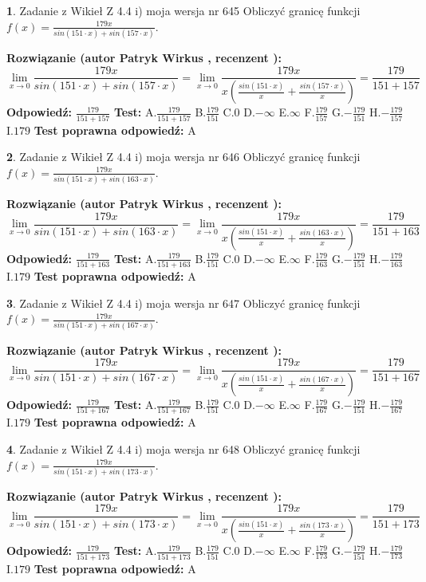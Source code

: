 \documentclass[12pt, a4paper]{article}
\theoremstyle{definition} %
\newtheorem{zad}{}
\newcommand{\zadStart}[1]{\begin{zad}#1\newline}
\newcommand{\zadStop}{\end{zad}}
\newcommand{\rozwStart}[2]{\noindent \textbf{Rozwiązanie (autor #1 , recenzent #2): }\newline}
\newcommand{\rozwStop}{\newline}
\newcommand{\odpStart}{\noindent \textbf{Odpowiedź:}\newline}
\newcommand{\odpStop}{\newline}
\newcommand{\testStart}{\noindent \textbf{Test:}\newline}
\newcommand{\testStop}{\newline}
\newcommand{\kluczStart}{\noindent \textbf{Test poprawna odpowiedź:}\newline}
\newcommand{\kluczStop}{\newline}
\begin{document}
\zadStart{Zadanie z Wikieł Z 4.4 i) moja wersja nr 645}
Obliczyć granicę funkcji $f(x)=\frac{179x}{sin(151\cdot x) +sin(157\cdot x)}$.
\zadStop
\rozwStart{Patryk Wirkus}{}
$$\lim\limits_{x\to 0}\frac{179x}{sin(151\cdot x) +sin(157\cdot x)}=\lim\limits_{x\to 0}\frac{179x}{x(\frac{sin(151\cdot x)}{x}+\frac{sin(157\cdot x)}{x})}=\frac{179}{151+157}$$
\rozwStop
\odpStart
$\frac{179}{151+157}$
\odpStop
\testStart
A.$\frac{179}{151+157}$
B.$\frac{179}{151}$
C.$0$
D.$-\infty$
E.$\infty$
F.$\frac{179}{157}$
G.$-\frac{179}{151}$
H.$-\frac{179}{157}$
I.$179$
\testStop
\kluczStart
A
\kluczStop



\zadStart{Zadanie z Wikieł Z 4.4 i) moja wersja nr 646}
Obliczyć granicę funkcji $f(x)=\frac{179x}{sin(151\cdot x) +sin(163\cdot x)}$.
\zadStop
\rozwStart{Patryk Wirkus}{}
$$\lim\limits_{x\to 0}\frac{179x}{sin(151\cdot x) +sin(163\cdot x)}=\lim\limits_{x\to 0}\frac{179x}{x(\frac{sin(151\cdot x)}{x}+\frac{sin(163\cdot x)}{x})}=\frac{179}{151+163}$$
\rozwStop
\odpStart
$\frac{179}{151+163}$
\odpStop
\testStart
A.$\frac{179}{151+163}$
B.$\frac{179}{151}$
C.$0$
D.$-\infty$
E.$\infty$
F.$\frac{179}{163}$
G.$-\frac{179}{151}$
H.$-\frac{179}{163}$
I.$179$
\testStop
\kluczStart
A
\kluczStop



\zadStart{Zadanie z Wikieł Z 4.4 i) moja wersja nr 647}
Obliczyć granicę funkcji $f(x)=\frac{179x}{sin(151\cdot x) +sin(167\cdot x)}$.
\zadStop
\rozwStart{Patryk Wirkus}{}
$$\lim\limits_{x\to 0}\frac{179x}{sin(151\cdot x) +sin(167\cdot x)}=\lim\limits_{x\to 0}\frac{179x}{x(\frac{sin(151\cdot x)}{x}+\frac{sin(167\cdot x)}{x})}=\frac{179}{151+167}$$
\rozwStop
\odpStart
$\frac{179}{151+167}$
\odpStop
\testStart
A.$\frac{179}{151+167}$
B.$\frac{179}{151}$
C.$0$
D.$-\infty$
E.$\infty$
F.$\frac{179}{167}$
G.$-\frac{179}{151}$
H.$-\frac{179}{167}$
I.$179$
\testStop
\kluczStart
A
\kluczStop



\zadStart{Zadanie z Wikieł Z 4.4 i) moja wersja nr 648}
Obliczyć granicę funkcji $f(x)=\frac{179x}{sin(151\cdot x) +sin(173\cdot x)}$.
\zadStop
\rozwStart{Patryk Wirkus}{}
$$\lim\limits_{x\to 0}\frac{179x}{sin(151\cdot x) +sin(173\cdot x)}=\lim\limits_{x\to 0}\frac{179x}{x(\frac{sin(151\cdot x)}{x}+\frac{sin(173\cdot x)}{x})}=\frac{179}{151+173}$$
\rozwStop
\odpStart
$\frac{179}{151+173}$
\odpStop
\testStart
A.$\frac{179}{151+173}$
B.$\frac{179}{151}$
C.$0$
D.$-\infty$
E.$\infty$
F.$\frac{179}{173}$
G.$-\frac{179}{151}$
H.$-\frac{179}{173}$
I.$179$
\testStop
\kluczStart
A
\kluczStop
\end{document}
